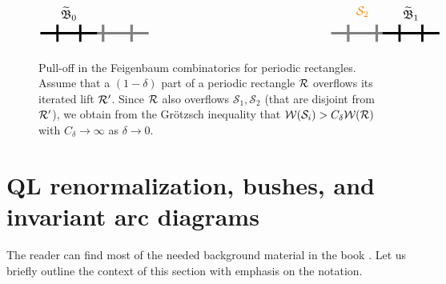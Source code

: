 \documentclass{amsart}
\newcommand{\bush}{{\mathfrak B }}
\newcommand{\1}{{\mathbb 1 }}
\newcommand{\FamS}{{\mathcal S}}
\newcommand{\Width}{{\mathcal W}}
\begin{document}
\begin{figure}[t!]
\[\begin{tikzpicture}[xscale=2,yscale=1.5]
\begin{scope}[shift={(0,-2)}]
\node[orange,scale=1.2] at (5.15,0.5) {$\FamS_2$};

\begin{scope}[rotate =0]
\draw[line width=0.8mm] (-0.5,0)--(0.5,0); 
\draw[line width=0.8mm] (-0.2,-0.2)--(-0.2,0.2);
\draw[line width=0.8mm] (0.2,-0.2)--(0.2,0.2);
\draw[line width=0.9mm,gray] (0.5,0) -- (1.4,0); 
\draw[line width=0.9mm,gray] (0.6,-0.2) -- (0.6,0.2); 
\draw[line width=0.9mm,gray] (1.1,-0.2) -- (1.1,0.2); 

\node[above,scale=1.2] at(0,0.2){$\widetilde \bush_0$};
 \end{scope}


\begin{scope}[shift={(6,0)}]
\draw[line width=0.9mm,gray] (-1.1,-0.2) -- (-1.1,0.2); 
\draw[line width=0.9mm,gray] (-0.6,-0.2) -- (-0.6,0.2); 
\draw[line width=0.9mm,gray] (-1.4,0) -- (-0.5,0); 
\draw[line width=0.8mm] (-0.5,0)--(0.5,0); 
\draw[line width=0.8mm] (-0.2,-0.2)--(-0.2,0.2);
\draw[line width=0.8mm] (0.2,-0.2)--(0.2,0.2);
\node[above,scale=1.2] at(0,0.2){$\widetilde \bush_1$};
  \end{scope}
  
  

\end{scope}
\end{tikzpicture}\]

\caption{Pull-off in the Feigenbaum combinatorics for periodic rectangles. Assume that a $(1-\delta)$ part of a periodic rectangle ${\mathcal R}$ overflows its iterated lift ${\mathcal R}'$. Since ${\mathcal R}$ also overflows $\FamS_1,\FamS_2$ (that are disjoint from ${\mathcal R}'$), we obtain from the Gr\"otzsch inequality that $\Width(\FamS_i)> C_\delta\Width(\RR)$ with $C_\delta\to \infty$ as $\delta\to 0$.}
\label{Fg:Sat Pull off:Feig Comb}
\end{figure}





 \section{QL renormalization, bushes, and invariant arc diagrams} \label{ql maps}
The reader can find most of the needed background material in the book \cite{L:book}. Let us briefly outline the context of this section with emphasis on the notation.
\end{document}
